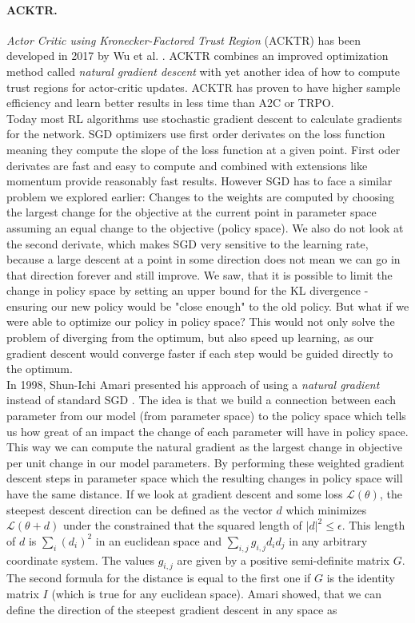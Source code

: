 \paragraph{ACKTR.} \textit{Actor Critic using Kronecker-Factored Trust Region} (ACKTR) has been developed in 2017 by Wu et al. \cite{wu2017scalable}. ACKTR combines an improved optimization method called \textit{natural gradient descent} with yet another idea of how to compute trust regions for actor-critic updates. ACKTR has proven to have higher sample efficiency and learn better results in less time than A2C or TRPO. \\
Today most RL algorithms use stochastic gradient descent to calculate gradients for the network. SGD optimizers use first order derivates on the loss function meaning they compute the slope of the loss function at a given point. First oder derivates are fast and easy to compute and combined with extensions like momentum provide reasonably fast results. However SGD has to face a similar problem we explored earlier: Changes to the weights are computed by choosing  the largest change for the objective at the current point in parameter space assuming an equal change to the objective (policy space). We also do not look at the second derivate, which makes SGD very sensitive to the learning rate, because a large descent at a point in some direction does not mean we can go in that direction forever and still improve. We saw, that it is possible to limit the change in policy space by setting an upper bound for the KL divergence - ensuring our new policy would be "close enough" to the old policy. But what if we were able to optimize our policy in policy space? This would not only solve the problem of diverging from the optimum, but also speed up learning, as our gradient descent would converge faster if each step would be guided directly to the optimum. \\
In 1998, Shun-Ichi Amari presented his approach of using a \textit{natural gradient} instead of standard SGD \cite{amari1998natural}. The idea is that we build a connection between each parameter from our model (from parameter space) to the policy space which tells us how great of an impact the change of each parameter will have in policy space. This way we can compute the natural gradient as the largest change in objective per unit change in our model parameters. By performing these weighted gradient descent steps in parameter space which the resulting changes in policy space will have the same distance.
If we look at gradient descent and some loss $\mathcal{L}(\theta)$, the steepest descent direction can be defined as the vector $d$ which minimizes $\mathcal{L}(\theta + d)$ under the constrained that the squared length of $|d|^2 \leq \epsilon$. This length of $d$ is $\sum_i (d_i)^2$ in an euclidean space and $\sum_{i, j} g_{i, j}d_i d_j$ in any arbitrary coordinate system. The values $g_{i, j}$ are given by a positive semi-definite matrix $G$. The second formula for the distance is equal to the first one if $G$ is the identity matrix $I$ (which is true for any euclidean space). Amari showed, that we can define the direction of the steepest gradient descent in any space as 

